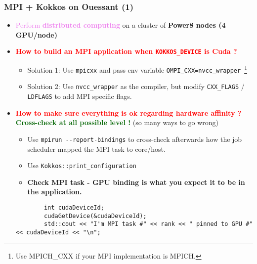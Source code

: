\begin{frame}[fragile=singleslide]
  \frametitle{MPI + Kokkos on Ouessant (1)}

  \begin{itemize}
  \item \textcolor{violet}{Perform \textbf{distributed computing}} on a cluster of \textbf{Power8 nodes (4 GPU/node)}
  \item \textcolor{red}{\bf How to build an MPI application when \texttt{KOKKOS\_DEVICE} is Cuda ?}
    \begin{itemize}
    \item Solution 1: Use \texttt{mpicxx} and pass env variable \texttt{OMPI\_CXX=nvcc\_wrapper}~\footnote{Use MPICH\_CXX if your MPI implementation is MPICH.}
    \item Solution 2: Use \texttt{nvcc\_wrapper} as the compiler, but modify \texttt{CXX\_FLAGS} / \texttt{LDFLAGS} to add MPI specific flags.
    \end{itemize}
  \item \textcolor{red}{\bf How to make sure everything is ok regarding hardware affinity ? }
    \textcolor{darkgreen}{\textbf{Cross-check at all possible level !}} (so many ways to go wrong)
    \begin{itemize}
    \item Use \texttt{mpirun \--\--report-bindings} to cross-check afterwards how the job scheduler mapped the MPI task to core/host.
    \item Use \texttt{Kokkos::print\_configuration}
    \item {\bf Check MPI task - GPU binding is what you expect it to be in the application.}
    \end{itemize} 
    {\scriptsize
      \begin{verbatim}
        int cudaDeviceId;
        cudaGetDevice(&cudaDeviceId);
        std::cout << "I'm MPI task #" << rank << " pinned to GPU #" << cudaDeviceId << "\n";
      \end{verbatim}
    }
  \end{itemize}

\end{frame}

